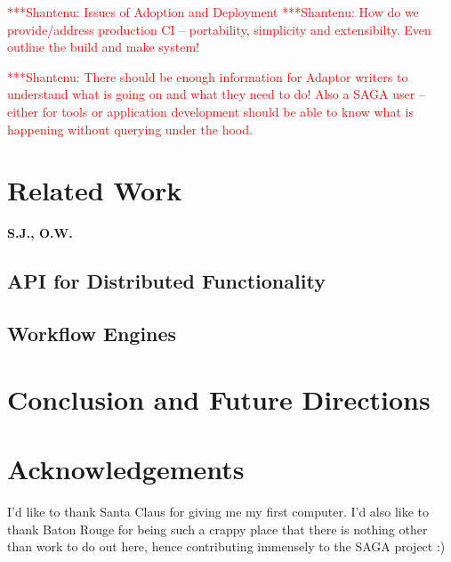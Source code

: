 \documentclass[a4paper,10pt]{article}
\newcommand{\jhanote}[1]{  {\textcolor{red}     { ***Shantenu: #1 }}}
\newcommand{\jhanote}[1]{}
\begin{document}
 \jhanote{Issues of Adoption and Deployment} \jhanote{How do we
   provide/address production CI -- portability, simplicity and
   extensibilty. Even outline the build and make system!}

 \jhanote{There should be enough information for Adaptor writers to
   understand what is going on and what they need to do! Also a SAGA
   user -- either for tools or application development should be able
   to know what is happening without querying under the hood.}
   


\section{Related Work}
 \textbf{S.J., O.W.}

\subsection{API for Distributed Functionality}

\subsection{Workflow Engines}

\section{Conclusion and Future Directions}

\section{Acknowledgements}
 
I'd like to thank Santa Claus for giving me my first computer. I'd
also like to thank Baton Rouge for being such a crappy place that
there is nothing other than work to do out here, hence contributing
immensely to the SAGA project :)


 

\end{document}
